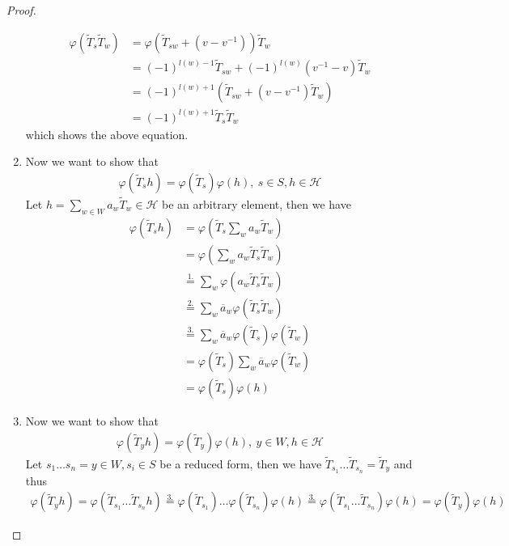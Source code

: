 \documentclass[]{article}
\begin{document}
\begin{proof}
\begin{enumerate}
        \begin{align*}
            \varphi(\widetilde{T}_s \widetilde{T}_w) &= \varphi(\widetilde{T}_{sw}+(v-v^{-1}))\widetilde{T}_w \\
            &=(-1)^{l(w)-1} \widetilde{T}_{sw} + (-1)^{l(w)}(v^{-1}-v)\widetilde{T}_w \\
            &=(-1)^{l(w)+1} (\widetilde{T}_{sw} + (v- v^{-1}) \widetilde{T}_w) \\
            &=(-1)^{l(w)+1} \widetilde{T}_s \widetilde{T}_w
        \end{align*}
        which shows the above equation. 
        \item Now we want to show that
        \begin{align*}
            \varphi(\widetilde{T}_s h) = \varphi(\widetilde{T}_s) \varphi(h), \ s \in S, h \in \mathscr{H}
        \end{align*}
        Let \(h = \sum_{w \in W}^{}a_w \widetilde{T}_w \in \mathscr{H}\) be an arbitrary element, then we have 
        \begin{align*}
            \varphi(\widetilde{T}_s h) &= \varphi\left(\widetilde{T}_s \sum_{w}^{} a_w \widetilde{T}_w\right) \\
            &=\varphi\left( \sum_{w}^{} a_w \widetilde{T}_s\widetilde{T}_w\right) \\
            &\overset{1.}{=} \sum_{w}^{} \varphi(a_w \widetilde{T}_s\widetilde{T}_w) \\
            &\overset{2.}{=} \sum_{w}^{} \overline{a}_w \varphi(\widetilde{T}_s\widetilde{T}_w) \\
            &\overset{3.}{=} \sum_{w}^{} \overline{a}_w \varphi(\widetilde{T}_s)\varphi(\widetilde{T}_w) \\
            &=\varphi(\widetilde{T}_s) \sum_{w}^{} \overline{a}_w \varphi(\widetilde{T}_w) \\
            &= \varphi(\widetilde{T}_s) \varphi(h)
        \end{align*}
        \item Now we want to show that
        \begin{align*}
            \varphi(\widetilde{T}_y h) = \varphi(\widetilde{T}_y) \varphi(h), \ y \in W, h \in \mathscr{H}
        \end{align*}
        Let \(s_1 \dots s_n = y \in W, s_i \in S\) be a reduced form, then we have \(\widetilde{T}_{s_1}\dots \widetilde{T}_{s_n} = \widetilde{T}_y\) and thus
        \begin{align*}
            \varphi(\widetilde{T}_y h) = \varphi(\widetilde{T}_{s_1}\dots \widetilde{T}_{s_n}h) \overset{3.}{=} \varphi(\widetilde{T}_{s_1})\dots \varphi(\widetilde{T}_{s_n})\varphi(h) \overset{3.}{=} \varphi(\widetilde{T}_{s_1}\dots \widetilde{T}_{s_n}) \varphi(h ) = \varphi(\widetilde{T}_y) \varphi(h)
        \end{align*}
    \end{enumerate}
\end{proof}
\end{document}

